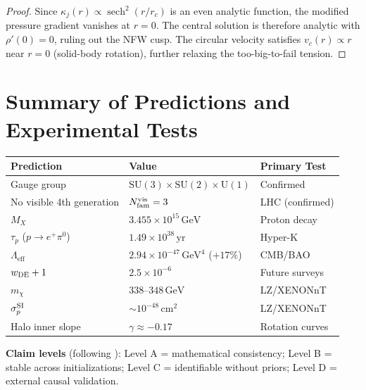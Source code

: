 \documentclass[12pt]{article}
\theoremstyle{plain}
\theoremstyle{definition}
\numberwithin{equation}{section}
\newcommand{\eff}{\mathrm{eff}}
\DeclareMathOperator{\sech}{sech}
\begin{document}
\begin{proof}
Since $\kappa_j(r)\propto\sech^2(r/r_c)$ is an even analytic function,
the modified pressure gradient vanishes at $r=0$.  The central solution
is therefore analytic with $\rho'(0)=0$, ruling out the NFW cusp.
The circular velocity satisfies $v_c(r)\propto r$ near $r=0$ (solid-body
rotation), further relaxing the too-big-to-fail tension.
\end{proof}

\section{Summary of Predictions and Experimental Tests}\label{sec:summary}

\begin{center}
\begin{tabular}{p{4.5cm}p{4cm}p{4cm}}
\toprule
Prediction & Value & Primary Test\\
\midrule
Gauge group & $\mathrm{SU}(3)\times\mathrm{SU}(2)\times\mathrm{U}(1)$ & Confirmed\\
No visible 4th generation & $N_{\rm fam}^{\rm vis}=3$ & LHC (confirmed)\\
$M_X$ & $3.455\times10^{15}\,\mathrm{GeV}$ & Proton decay\\
$\tau_p$ ($p\to e^+\pi^0$) & $1.49\times10^{38}\,\mathrm{yr}$ & Hyper-K\\
$\Lambda_\eff$ & $2.94\times10^{-47}\,\mathrm{GeV}^4$ ($+17\%$) & CMB/BAO\\
$w_{\rm DE}+1$ & $2.5\times10^{-6}$ & Future surveys\\
$m_\chi$ & $338$--$348\,\mathrm{GeV}$ & LZ/XENONnT\\
$\sigma_p^{\rm SI}$ & $\sim10^{-48}\,\mathrm{cm}^2$ & LZ/XENONnT\\
Halo inner slope & $\gamma\approx-0.17$ & Rotation curves\\
\bottomrule
\end{tabular}
\end{center}

\medskip

\noindent\textbf{Claim levels} (following \cite{YMmassGap}):
Level A = mathematical consistency; Level B = stable across
initializations; Level C = identifiable without priors;
Level D = external causal validation.
\end{document}
